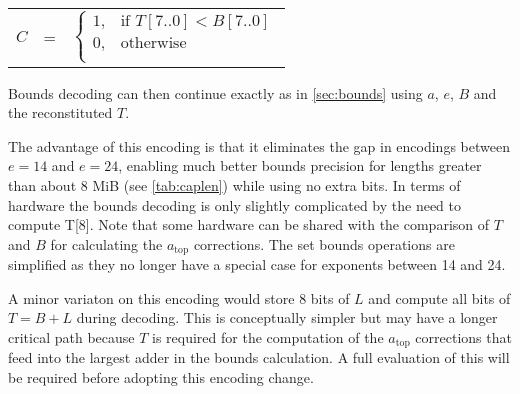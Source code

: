 \begin{center}
\begin{tabular}{r c l}
$C$ &=& $ \begin{cases}
              1,& \text{if } T[7..0] \lt B[7..0] \\
              0,& \text{otherwise} \\
\end{cases} $ \\
\end{tabular}
\end{center}

Bounds decoding can then continue exactly as in \cref{sec:bounds} using $a$, $e$, $B$ and the reconstituted $T$.

The advantage of this encoding is that it eliminates the gap in encodings between $e=14$ and $e=24$, enabling much better bounds precision for lengths greater than about 8 MiB (see \cref{tab:caplen}) while using no extra bits.
In terms of hardware the bounds decoding is only slightly complicated by the need to compute T[8].
Note that some hardware can be shared with the comparison of $T$ and $B$ for calculating the $a_\text{top}$ corrections.
The set bounds operations are simplified as they no longer have a special case for exponents between 14 and 24.

A minor variaton on this encoding would store 8 bits of $L$ and compute all bits of $T = B + L$ during decoding.
This is conceptually simpler but may have a longer critical path because $T$ is required for the computation of the $a_\text{top}$ corrections that feed into the largest adder in the bounds calculation.
A full evaluation of this will be required before adopting this encoding change.
